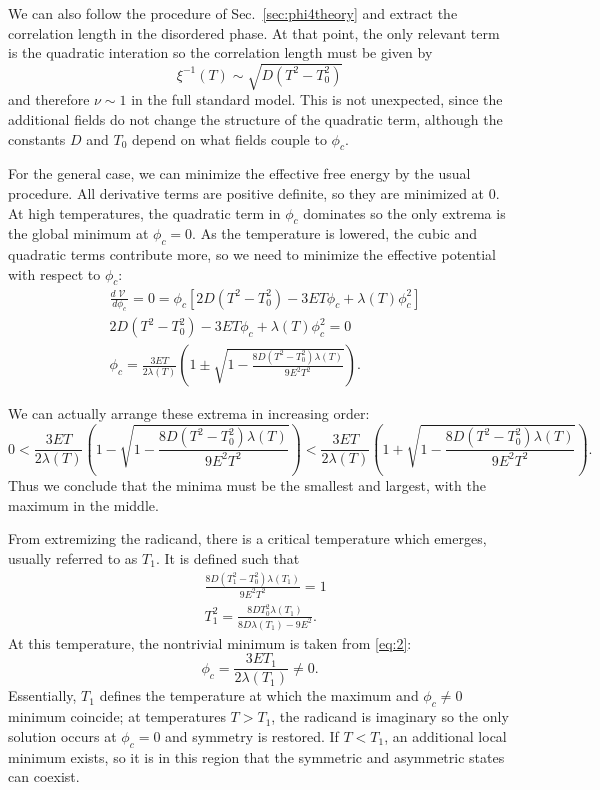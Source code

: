 \documentclass[%
 reprint,
nofootinbib,
 amsmath,amssymb,
 aps,
floatfix,
]{revtex4-1}
\DeclareMathOperator{\V}{\mathcal{V}}
\begin{document}
We can also follow the procedure of Sec.~\ref{sec:phi4theory} and extract the correlation length in the disordered phase.
At that point, the only relevant term is the quadratic interation so the correlation length must be given by
\begin{equation}
    \xi^{-1}(T) \sim \sqrt{D(T^2-T_0^2)} 
\end{equation}
and therefore $\nu \sim 1$ in the full standard model.
This is not unexpected, since the additional fields do not change the structure of the quadratic term, although the constants $D$ and $T_0$ depend on what fields couple to $\phi_c$.

For the general case, we can minimize the effective free energy by the usual procedure. All derivative terms are positive definite, so they are minimized at $0$.
At high temperatures, the quadratic term in $\phi_c$ dominates so the only extrema is the global minimum at $\phi_c = 0$.
As the temperature is lowered, the cubic and quadratic terms contribute more, so we need to minimize the effective potential with respect to $\phi_c$:
\begin{align}
    &\frac{d\V}{d\phi_c} = 0 = \phi_c\left[2D\left(T^2-T_0^2\right) - 3ET\phi_c + \lambda(T)\phi_c^2\right] \\
    &2D\left(T^2-T_0^2\right) - 3ET\phi_c + \lambda(T)\phi_c^2 = 0 \\
    &\phi_c = \frac{3ET}{2\lambda(T)}\left(1 \pm \sqrt{1-\frac{8D(T^2-T_0^2)\lambda(T)}{9E^2T^2}}\right)\label{eq:2}.
\end{align}
\begin{widetext}
We can actually arrange these extrema in increasing order:
\begin{equation}
    0 < \frac{3ET}{2\lambda(T)}\left(1 - \sqrt{1-\frac{8D(T^2-T_0^2)\lambda(T)}{9E^2T^2}}\right) < \frac{3ET}{2\lambda(T)}\left(1 + \sqrt{1-\frac{8D(T^2-T_0^2)\lambda(T)}{9E^2T^2}}\right).
\end{equation}
Thus we conclude that the minima must be the smallest and largest, with the maximum in the middle.
\end{widetext}

From extremizing the radicand, there is a critical temperature which emerges, usually referred to as $T_1$.
It is defined such that
\begin{equation}
\begin{split}
    &\frac{8D(T_1^2-T_0^2)\lambda(T_1)}{9E^2T^2} = 1 \\
    &T_1^2 = \frac{8DT_0^2\lambda(T_1)}{8D\lambda(T_1)-9E^2}.
\end{split}
\end{equation}
At this temperature, the nontrivial minimum is taken from \ref{eq:2}:
\begin{equation}
    \phi_c = \frac{3ET_1}{2\lambda(T_1)} \neq 0.
\end{equation}
Essentially, $T_1$ defines the temperature at which the maximum and $\phi_c \neq 0$ minimum coincide; at temperatures $T>T_1$, the radicand is imaginary so the only solution occurs at $\phi_c = 0$ and symmetry is restored.
If $T<T_1$, an additional local minimum exists, so it is in this region that the symmetric and asymmetric states can coexist.
\end{document}
